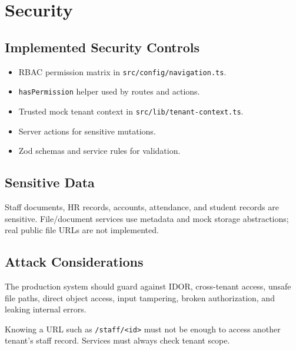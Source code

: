 \chapter{Security}
\section{Implemented Security Controls}
\begin{itemize}
\item RBAC permission matrix in \texttt{src/config/navigation.ts}.
\item \texttt{hasPermission} helper used by routes and actions.
\item Trusted mock tenant context in \texttt{src/lib/tenant-context.ts}.
\item Server actions for sensitive mutations.
\item Zod schemas and service rules for validation.
\end{itemize}

\section{Sensitive Data}
Staff documents, HR records, accounts, attendance, and student records are sensitive. File/document services use metadata and mock storage abstractions; real public file URLs are not implemented.

\section{Attack Considerations}
The production system should guard against IDOR, cross-tenant access, unsafe file paths, direct object access, input tampering, broken authorization, and leaking internal errors.

\begin{securitybox}
Knowing a URL such as \texttt{/staff/<id>} must not be enough to access another tenant's staff record. Services must always check tenant scope.
\end{securitybox}
